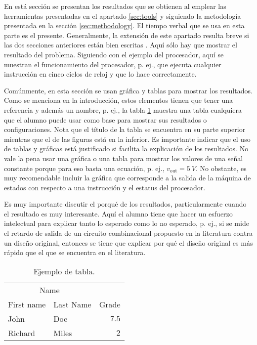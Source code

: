 \documentclass[10pt, twocolumn]{article}
\begin{document}
En está sección se presentan los resultados que se obtienen al emplear las herramientas presentadas en el apartado \ref{sec:tools} y siguiendo la metodología presentada en la sección \ref{sec:methodology}. El tiempo verbal que se usa en esta parte es el presente. Generalmente, la extensión de este apartado resulta breve si las dos secciones anteriores están bien escritas \cite{DaRo05}. Aquí sólo hay que mostrar el resultado del problema. Siguiendo con el ejemplo del procesador, aquí se muestran el funcionamiento del procesador, p. ej., que ejecuta cualquier instrucción en cinco ciclos de reloj y que lo hace correctamente.

Comúnmente, en esta sección se usan gráfica y tablas para mostrar los resultados. Como se menciona en la introducción, estos elementos tienen que tener una referencia y además un nombre, p. ej., la tabla \ref{tab:example} muestra una tabla cualquiera que el alumno puede usar como base para mostrar sus resultados o configuraciones. Nota que el título de la tabla se encuentra en su parte superior mientras que el de las figuras está en la inferior. Es importante indicar que el uso de tablas y gráficas está justificado si facilita la explicación de los resultados. No vale la pena usar una gráfica o una tabla para mostrar los valores de una señal constante porque para eso basta una ecuación, p. ej., $v_\mathrm{out} = \SI{5}{V}$. No obstante, es muy recomendable incluir la gráfica que corresponde a la salida de la máquina de estados con respecto a una instrucción y el estatus del procesador.

Es muy importante discutir el porqué de los resultados, particularmente cuando el resultado es muy interesante. Aquí el alumno tiene que hacer un esfuerzo intelectual para explicar tanto lo esperado como lo no esperado, p. ej., si se mide el retardo de salida de un circuito combinacional propuesto en la literatura contra un diseño original, entonces se tiene que explicar por qué el diseño original es más rápido que el que se encuentra en el literatura.

\begin{table}
   \centering
   \caption{Ejemplo de tabla.}
   \begin{tabular}{llr}
      \toprule
      \multicolumn{2}{c}{Name} \\
      \cmidrule(r){1-2} First name & Last Name & Grade \\ 
      \midrule John & Doe & $7.5$ \\
      Richard & Miles & $2$ \\
      \bottomrule
   \end{tabular}
   \label{tab:example}
\end{table}
\end{document}
